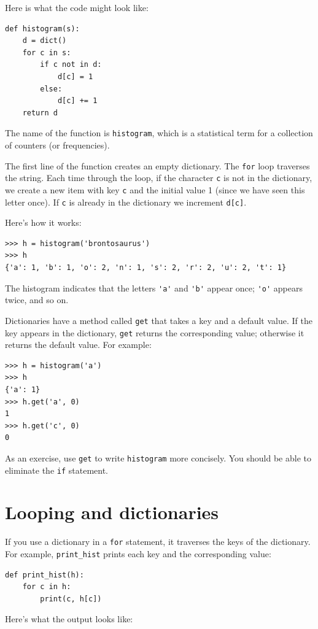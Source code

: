 \documentclass[10pt]{book}
\begin{document}
Here is what the code might look like:

\begin{verbatim}
def histogram(s):
    d = dict()
    for c in s:
        if c not in d:
            d[c] = 1
        else:
            d[c] += 1
    return d
\end{verbatim}
%
The name of the function is {\tt histogram}, which is a statistical
term for a collection of counters (or frequencies).

The first line of the
function creates an empty dictionary.  The {\tt for} loop traverses
the string.  Each time through the loop, if the character {\tt c} is
not in the dictionary, we create a new item with key {\tt c} and the
initial value 1 (since we have seen this letter once).  If {\tt c} is
already in the dictionary we increment {\tt d[c]}.

Here's how it works:

\begin{verbatim}
>>> h = histogram('brontosaurus')
>>> h
{'a': 1, 'b': 1, 'o': 2, 'n': 1, 's': 2, 'r': 2, 'u': 2, 't': 1}
\end{verbatim}
%
The histogram indicates that the letters \verb"'a'" and \verb"'b'"
appear once; \verb"'o'" appears twice, and so on.


Dictionaries have a method called {\tt get} that takes a key
and a default value.  If the key appears in the dictionary,
{\tt get} returns the corresponding value; otherwise it returns
the default value.  For example:

\begin{verbatim}
>>> h = histogram('a')
>>> h
{'a': 1}
>>> h.get('a', 0)
1
>>> h.get('c', 0)
0
\end{verbatim}
%
As an exercise, use {\tt get} to write {\tt histogram} more concisely.  You
should be able to eliminate the {\tt if} statement.


\section{Looping and dictionaries}

If you use a dictionary in a {\tt for} statement, it traverses
the keys of the dictionary.  For example, \verb"print_hist"
prints each key and the corresponding value:

\begin{verbatim}
def print_hist(h):
    for c in h:
        print(c, h[c])
\end{verbatim}
%
Here's what the output looks like:
\end{document}
